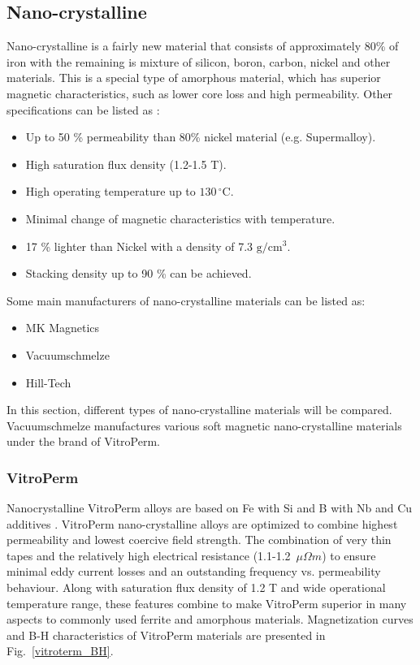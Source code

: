 \documentclass[a4paper, 11pt]{article} %
\begin{document}
\subsection*{Nano-crystalline}

Nano-crystalline is a fairly new material that consists of approximately 80\% of iron with the remaining is mixture of silicon, boron, carbon, nickel and other materials. This is a special type of amorphous material, which has superior magnetic characteristics, such as lower core loss and high permeability. Other specifications can be listed as \cite{Magnetics}:

\begin{itemize}
  \item Up to 50 \% permeability than 80\% nickel material (e.g. Supermalloy).
  \item High saturation flux density (1.2-1.5 T).
  \item High operating temperature up to $130\,^{\circ}\mathrm{C}$.
  \item Minimal change of magnetic characteristics with temperature.
  \item 17 \% lighter than Nickel with a density of 7.3 $\mathrm{g/cm^3}$.
  \item Stacking density up to 90 \% can be achieved.
\end{itemize}

Some main manufacturers of nano-crystalline materials can be listed as:

\begin{itemize}
  \item MK Magnetics
  \item Vacuumschmelze
  \item Hill-Tech
\end{itemize}

In this section, different types of nano-crystalline materials will be compared. 
Vacuumschmelze manufactures various soft magnetic nano-crystalline materials under the brand of VitroPerm.


\subsubsection*{VitroPerm}

Nanocrystalline VitroPerm alloys are based on Fe with Si and B with Nb and Cu additives \cite{vitroterm_manual}. VitroPerm nano-crystalline alloys are optimized to combine highest permeability and lowest coercive field strength. The combination of very thin tapes and the relatively high electrical resistance (1.1-1.2~$\mu \Omega m$) to ensure minimal eddy current losses and an outstanding frequency vs. permeability behaviour. Along with saturation flux density of 1.2 T and wide operational temperature range, these features combine to make VitroPerm  superior in many aspects to commonly used ferrite and amorphous materials. Magnetization curves and B-H characteristics of VitroPerm materials are presented in Fig.~\ref{vitroterm_BH}.
\end{document}
